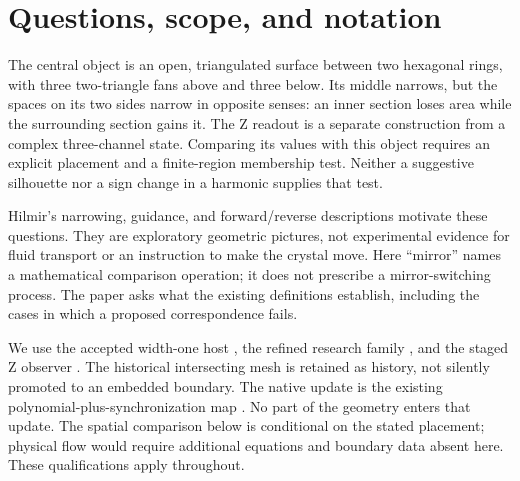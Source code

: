 \documentclass[11pt,a4paper]{article}
\numberwithin{equation}{section}
\begin{document}
\newpage
\tableofcontents
\newpage

\section{Questions, scope, and notation}\label{sec:intro}
The central object is an open, triangulated surface between two hexagonal
rings, with three two-triangle fans above and three below. Its middle narrows,
but the spaces on its two sides narrow in opposite senses: an inner section
loses area while the surrounding section gains it. The Z readout is a separate
construction from a complex three-channel state. Comparing its values with
this object requires an explicit placement and a finite-region membership
test. Neither a suggestive silhouette nor a sign change in a harmonic supplies
that test.

Hilmir's narrowing, guidance, and forward/reverse descriptions motivate these
questions. They are exploratory geometric pictures, not experimental evidence
for fluid transport or an instruction to make the crystal move. Here
``mirror'' names a mathematical comparison operation; it does not prescribe
a mirror-switching process. The paper asks what the existing definitions
establish, including the cases in which a proposed correspondence fails.

We use the accepted width-one host \cite{PaperC,Host}, the refined research
family \cite{Registration,Family}, and the staged Z observer
\cite{PaperE,Atlas6}. The historical intersecting mesh is retained as history,
not silently promoted to an embedded boundary. The native update is the
existing polynomial-plus-synchronization map \cite{Native}. No part of the
geometry enters that update. The spatial comparison below is conditional on
the stated placement; physical flow would require additional equations and
boundary data absent here. These qualifications apply throughout.
\end{document}
